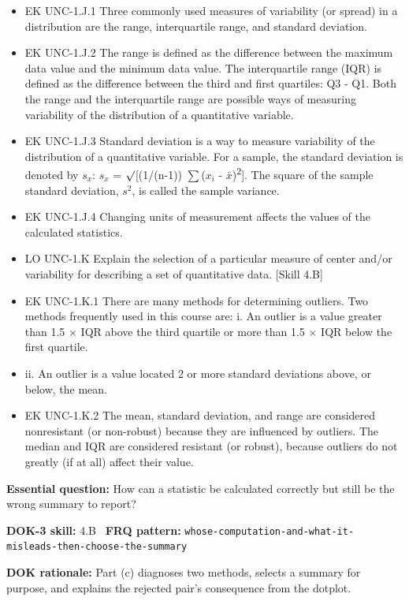 \documentclass[11pt]{article}
\begin{document}
{\begin{itemize}[leftmargin=1.5em,itemsep=2pt,topsep=2pt]
  \item EK UNC-1.J.1 Three commonly used measures of variability (or spread) in a distribution are the range, interquartile range, and standard deviation.
  \item EK UNC-1.J.2 The range is defined as the difference between the maximum data value and the minimum data value. The interquartile range (IQR) is defined as the difference between the third and first quartiles: Q3 - Q1. Both the range and the interquartile range are possible ways of measuring variability of the distribution of a quantitative variable.
  \item EK UNC-1.J.3 Standard deviation is a way to measure variability of the distribution of a quantitative variable. For a sample, the standard deviation is denoted by $s_x$: $s_x$ = $\surd$[(1/(n-1)) $\sum$($x_i$ - $\bar{x}$)\textsuperscript{2}]. The square of the sample standard deviation, $s^2$, is called the sample variance.
  \item EK UNC-1.J.4 Changing units of measurement affects the values of the calculated statistics.
  \item LO UNC-1.K Explain the selection of a particular measure of center and/or variability for describing a set of quantitative data. [Skill 4.B]
  \item EK UNC-1.K.1 There are many methods for determining outliers. Two methods frequently used in this course are: i. An outlier is a value greater than 1.5 $\times$ IQR above the third quartile or more than 1.5 $\times$ IQR below the first quartile.
  \item ii. An outlier is a value located 2 or more standard deviations above, or below, the mean.
  \item EK UNC-1.K.2 The mean, standard deviation, and range are considered nonresistant (or non-robust) because they are influenced by outliers. The median and IQR are considered resistant (or robust), because outliers do not greatly (if at all) affect their value.
\end{itemize}
}
\textbf{Essential question:} How can a statistic be calculated correctly but still be the wrong summary to report?\par
\textbf{DOK-3 skill:} 4.B \textperiodcentered\ \textbf{FRQ pattern:} {\small\texttt{whose-\allowbreak{}computation-\allowbreak{}and-\allowbreak{}what-\allowbreak{}it-\allowbreak{}misleads-\allowbreak{}then-\allowbreak{}choose-\allowbreak{}the-\allowbreak{}summary}}\par
\textbf{DOK rationale:} Part (c) diagnoses two methods, selects a summary for purpose, and explains the rejected pair's consequence from the dotplot.\par
\end{document}
